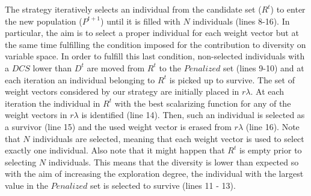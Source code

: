 The strategy iteratively selects an individual from the candidate set ($R^t$) to enter the new population ($P^{t+1}$) until
it is filled with $N$ individuals (lines 8-16).
%
In particular, the aim is to select a proper individual for each weight vector but at the same time fulfilling
the condition imposed for the contribution to diversity on variable space.
%
In order to fulfill this last condition, non-selected individuals with a $DCS$
lower than $D^t$ are moved from $R^t$ to the $Penalized$ set (lines 9-10) and at each iteration
an individual belonging to $R^t$ is picked up to survive.
%
The set of weight vectors considered by our strategy are initially placed in $r\lambda$.
%
At each iteration the individual in $R^t$ with the best scalarizing function for any of the weight vectors in
$r\lambda$ is identified (line 14).
%
Then, such an individual is selected as a survivor (line 15) and the used weight vector is erased
from $r\lambda$ (line 16).
%
Note that $N$ individuals are selected, meaning that each weight vector is used to select exactly one individual.
%
Also note that it might happen that $R^t$ is empty prior to selecting $N$ individuals.
%
This means that the diversity is lower than expected so
with the aim of increasing the exploration degree, the individual with the largest \DCS{} value in
the $Penalized$ set is selected to survive (lines 11 - 13).
